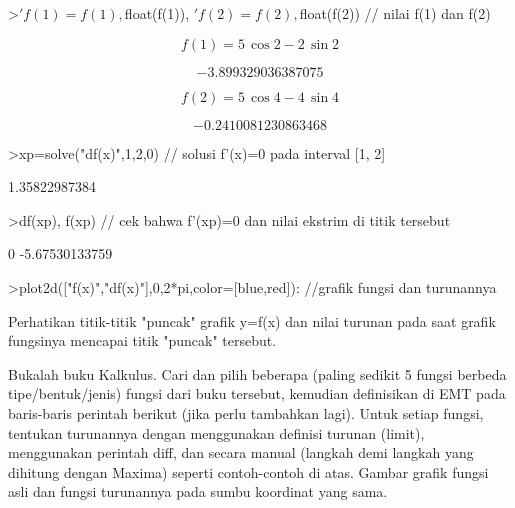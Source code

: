 \documentclass[a4paper,10pt]{article}
\begin{document}
\begin{eulernotebook}
\begin{eulercomment}
\begin{eulercomment}
\begin{eulercomment}
\begin{eulercomment}
\begin{eulercomment}
\begin{eulercomment}
\begin{eulercomment}
\begin{eulercomment}
\begin{euleroutput}
\end{euleroutput}
\begin{eulerprompt}
>$'f(1)=f(1), $float(f(1)), $'f(2)=f(2), $float(f(2)) // nilai f(1) dan f(2)
\end{eulerprompt}
\begin{eulerformula}
\[
f\left(1\right)=5\,\cos 2-2\,\sin 2
\]
\end{eulerformula}
\begin{eulerformula}
\[
-3.899329036387075
\]
\end{eulerformula}
\begin{eulerformula}
\[
f\left(2\right)=5\,\cos 4-4\,\sin 4
\]
\end{eulerformula}
\begin{eulerformula}
\[
-0.2410081230863468
\]
\end{eulerformula}
\begin{eulerprompt}
>xp=solve("df(x)",1,2,0) // solusi f'(x)=0 pada interval [1, 2]
\end{eulerprompt}
\begin{euleroutput}
  1.35822987384
\end{euleroutput}
\begin{eulerprompt}
>df(xp), f(xp) // cek bahwa f'(xp)=0 dan nilai ekstrim di titik tersebut
\end{eulerprompt}
\begin{euleroutput}
  0
  -5.67530133759
\end{euleroutput}
\begin{eulerprompt}
>plot2d(["f(x)","df(x)"],0,2*pi,color=[blue,red]): //grafik fungsi dan turunannya
\end{eulerprompt}
\begin{eulercomment}
Perhatikan titik-titik "puncak" grafik y=f(x) dan nilai turunan pada saat grafik fungsinya mencapai titik "puncak" tersebut.
\end{eulercomment}
\begin{euleroutput}
  
\end{euleroutput}
\begin{eulercomment}
Bukalah buku Kalkulus. Cari dan pilih beberapa (paling sedikit 5
fungsi berbeda tipe/bentuk/jenis) fungsi dari buku tersebut, kemudian
definisikan di EMT pada baris-baris perintah berikut (jika perlu
tambahkan lagi). Untuk setiap fungsi, tentukan turunannya dengan
menggunakan definisi turunan (limit), menggunakan perintah diff, dan
secara manual (langkah demi langkah yang dihitung dengan Maxima)
seperti contoh-contoh di atas. Gambar grafik fungsi asli dan fungsi
turunannya pada sumbu koordinat yang sama.


\end{eulercomment}
\end{eulercomment}
\end{eulercomment}
\end{eulercomment}
\end{eulercomment}
\end{eulercomment}
\end{eulercomment}
\end{eulercomment}
\end{eulercomment}
\end{eulernotebook}
\end{document}
